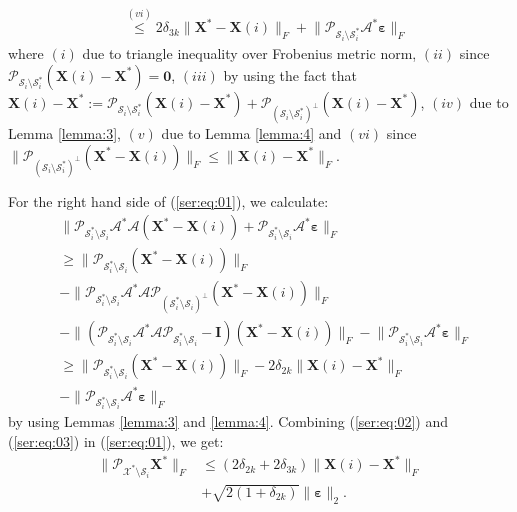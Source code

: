 \documentclass[twocolumn]{svjour3}
\newcommand{\vectornormbig}[1]{\big\|#1\big\|}
\newcommand{\sensing}{\boldsymbol{\mathcal{A}}}
\newcommand{\signal}{\boldsymbol{X}}
\newcommand{\bestsignal}{\boldsymbol{X}^\ast}
\newcommand{\noise}{\boldsymbol{\varepsilon}}
\newcommand{\id}{\mathbf{I}}
\newcommand{\rank}{k}
\begin{document}
\begin{align}
&\stackrel{(vi)}{\leq} 2\delta_{3\rank}\vectornormbig{\bestsignal - \signal(i)}_F + \vectornormbig{\mathcal{P}_{\mathcal{S}_i \setminus \mathcal{S}_i^\ast} \sensing^\ast \noise}_F \label{ser:eq:02}
\end{align} where $ (i) $ due to triangle inequality over Frobenius metric norm, $ (ii) $ since $ \mathcal{P}_{\mathcal{S}_i \setminus \mathcal{S}_i^\ast} (\signal(i) - \bestsignal) = \mathbf{0} $, $ (iii) $ by using the fact that $ \signal(i) - \bestsignal := \mathcal{P}_{\mathcal{S}_i \setminus \mathcal{S}_i^\ast}(\signal(i) - \bestsignal) + \mathcal{P}_{(\mathcal{S}_i \setminus \mathcal{S}_i^\ast)^\bot}(\signal(i) - \bestsignal) $, $ (iv) $ due to Lemma \ref{lemma:3}, $ (v) $ due to Lemma \ref{lemma:4} and $ (vi) $ since $ \vectornormbig{\mathcal{P}_{(\mathcal{S}_i \setminus \mathcal{S}_i^\ast)^\bot} (\bestsignal - \signal(i))}_F \leq \vectornormbig{\signal(i) - \bestsignal}_F $.

For the right hand side of (\ref{ser:eq:01}), we calculate:
\begin{align}
&\vectornormbig{\mathcal{P}_{\mathcal{S}_i^\ast \setminus \mathcal{S}_i} \sensing^\ast \sensing (\bestsignal - \signal(i)) + \mathcal{P}_{\mathcal{S}_i^\ast \setminus \mathcal{S}_i} \sensing^\ast \noise}_F \nonumber \\
&\geq \vectornormbig{\mathcal{P}_{\mathcal{S}_i^\ast \setminus \mathcal{S}_i} (\bestsignal - \signal(i))}_F \nonumber \\ &- \vectornormbig{\mathcal{P}_{\mathcal{S}_i^\ast \setminus \mathcal{S}_i} \sensing^\ast \sensing \mathcal{P}_{(\mathcal{S}_i^\ast \setminus \mathcal{S}_i)^{\bot}} (\bestsignal - \signal(i))}_F \nonumber \\ &- \vectornormbig{(\mathcal{P}_{\mathcal{S}_i^\ast \setminus \mathcal{S}_i} \sensing^\ast \sensing \mathcal{P}_{\mathcal{S}_i^\ast \setminus \mathcal{S}_i} - \id)(\bestsignal - \signal(i))}_F - \vectornormbig{ \mathcal{P}_{\mathcal{S}_i^\ast \setminus \mathcal{S}_i}\sensing^\ast \noise}_F \nonumber \\
&\geq \vectornormbig{\mathcal{P}_{\mathcal{S}_i^\ast \setminus \mathcal{S}_i} (\bestsignal - \signal(i))}_F - 2\delta_{2\rank}\vectornormbig{\signal(i) - \bestsignal}_F \nonumber \\ &- \vectornormbig{ \mathcal{P}_{\mathcal{S}_i^\ast \setminus \mathcal{S}_i}\sensing^\ast \noise}_F \label{ser:eq:03}
\end{align} by using Lemmas \ref{lemma:3} and \ref{lemma:4}. Combining (\ref{ser:eq:02}) and (\ref{ser:eq:03}) in (\ref{ser:eq:01}), we get:
\begin{align}
\vectornormbig{\mathcal{P}_{\mathcal{X}^\ast \setminus \mathcal{S}_i}\bestsignal}_F &\leq (2\delta_{2\rank} + 2\delta_{3\rank})\vectornormbig{\signal(i) - \bestsignal}_F \nonumber \\ &+ \sqrt{2(1+\delta_{2\rank})}\vectornormbig{\noise}_2. \nonumber
\end{align}
\end{document}
